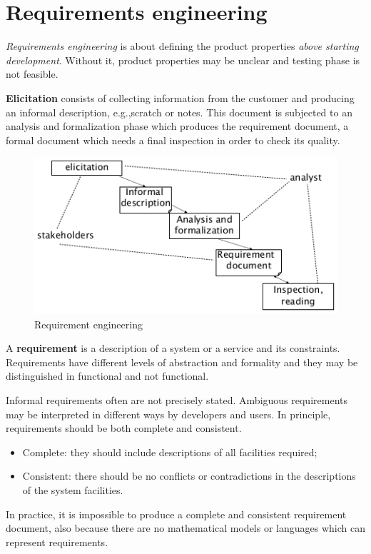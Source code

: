 \chapter{Requirements engineering}
\emph{Requirements engineering} is about defining the product properties \emph{above starting development}. Without it, product properties may be unclear and testing phase is not feasible.

\textbf{Elicitation} consists of collecting information from the customer and producing an informal description, e.g.,\@ scratch or notes. This document is subjected to an analysis and formalization phase which produces the requirement document, a formal document which needs a final inspection in order to check its quality.

\begin{figure}[hbtp]
\centering
\includegraphics[scale=0.4]{images/re_phases.png}
\caption{Requirement engineering}
\end{figure}

A \textbf{requirement} is a description of a system or a service and its constraints. Requirements have different levels of abstraction and formality and they may be distinguished in functional and not functional.

Informal requirements often are not precisely stated. Ambiguous requirements may be interpreted in different ways by developers and users. In principle, requirements should be both complete and consistent.
\begin{itemize}
\item Complete: they should include descriptions of all facilities required;
\item Consistent: there should be no conflicts or contradictions in the descriptions of the system facilities.
\end{itemize}
In practice, it is impossible to produce a complete and consistent requirement document, also because there are no mathematical models or languages which can represent requirements.

